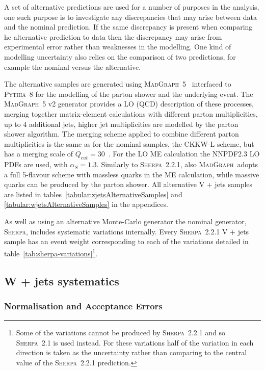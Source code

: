 A set of alternative predictions are used for a number of purposes in the
analysis, one such purpose is to investigate any discrepancies that may arise
between data and the nominal prediction. If the same discrepancy is present when
comparing he alternative prediction to data then the discrepancy may arise from
experimental error rather than weaknesses in the modelling. One kind of
modelling uncertainty also relies on the comparison of two predictions, for
example the nominal versus the alternative.

The alternative samples are generated using
\textsc{MadGraph}~5~\cite{MADGRAPH5_aMC@NLO} interfaced to \textsc{Pythia}~8 for
the modelling of the parton shower and the underlying event. The
\textsc{MadGraph}~5 v2 generator provides a LO (QCD) description of these
processes, merging together matrix-element calculations with different parton
multiplicities, up to 4 additional jets, higher jet multiplicities are modelled
by the parton shower algorithm. The merging scheme applied to combine different
parton multiplicities is the same as for the nominal samples, the CKKW-L scheme,
but has a merging scale of $Q_{cut} = 30$~\GeV. For the LO ME calculation the
NNPDF2.3 LO PDFs are used, with $\alpha_S = 1.3$.  Similarly to
\textsc{Sherpa}~2.2.1, also \textsc{MadGraph}~adopts a full 5-flavour scheme
with massless quarks in the ME calculation, while massive quarks can be produced
by the parton shower. All alternative V + jets samples are listed in
tables~\ref{tabular:zjetsAlternativeSamples} and
\ref{tabular:wjetsAlternativeSamples} in the appendices.

As well as using an alternative Monte-Carlo generator the nominal generator,
\textsc{Sherpa}, includes systematic variations internally. Every
\textsc{Sherpa}~2.2.1 V + jets sample has an event weight corresponding to each
of the variations detailed in table~\ref{tab:sherpa-variations}\footnote{Some of
the variations cannot be produced by \textsc{Sherpa}~2.2.1 and so
\textsc{Sherpa}~2.1 is used instead. For these variations half of the variation
in each direction is taken as the uncertainty rather than comparing to the
central value of the \textsc{Sherpa}~2.2.1 prediction.}.


\subsection{W + jets systematics}


\subsubsection{Normalisation and Acceptance Errors}

